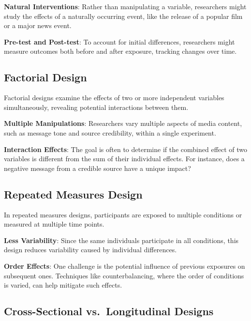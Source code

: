 \documentclass[
  b5paper]{book}
\begin{document}
\textbf{Natural Interventions}: Rather than manipulating a variable, researchers might study the effects of a naturally occurring event, like the release of a popular film or a major news event.

\textbf{Pre-test and Post-test}: To account for initial differences, researchers might measure outcomes both before and after exposure, tracking changes over time.

\hypertarget{factorial-design}{%
\subsection*{Factorial Design}\label{factorial-design}}

Factorial designs examine the effects of two or more independent variables simultaneously, revealing potential interactions between them.

\textbf{Multiple Manipulations}: Researchers vary multiple aspects of media content, such as message tone and source credibility, within a single experiment.

\textbf{Interaction Effects}: The goal is often to determine if the combined effect of two variables is different from the sum of their individual effects. For instance, does a negative message from a credible source have a unique impact?

\hypertarget{repeated-measures-design}{%
\subsection*{Repeated Measures Design}\label{repeated-measures-design}}

In repeated measures designs, participants are exposed to multiple conditions or measured at multiple time points.

\textbf{Less Variability}: Since the same individuals participate in all conditions, this design reduces variability caused by individual differences.

\textbf{Order Effects}: One challenge is the potential influence of previous exposures on subsequent ones. Techniques like counterbalancing, where the order of conditions is varied, can help mitigate such effects.

\hypertarget{cross-sectional-vs.-longitudinal-designs}{%
\subsection*{Cross-Sectional vs.~Longitudinal Designs}\label{cross-sectional-vs.-longitudinal-designs}}
\end{document}

